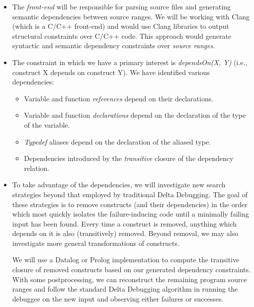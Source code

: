 \documentclass[11pt]{article}
\begin{document}
\begin{itemize}
\item The \emph{front-end} will be responsible for parsing source files and
  generating semantic dependencies between source ranges. We will be working
  with Clang (which is a C/C++ front-end) and would use Clang libraries to
  output structural constraints over C/C++ code.  This approach would generate
  syntactic and semantic dependency constraints over \emph{source ranges}.

\item The constraint in which we have a primary interest is \emph{dependsOn(X,
  Y)} (i.e., construct X depends on construct Y).  We have identified various
  dependencies:

\begin{itemize}
\item{Variable and function \emph{references} depend on their declarations.}
\item{Variable and function \emph{declarations} depend on the declaration of the
  type of the variable.}
\item{\emph{Typedef} aliases depend on the declaration of the aliased type.}
\item{Dependencies introduced by the \emph{transitive} closure of the dependency
  relation.
}
\end{itemize}

\item To take advantage of the dependencies, we will investigate new search
  strategies beyond that employed by traditional Delta Debugging.  The goal of
  these strategies is to remove constructs (and their dependencies) in the order
  which most quickly isolates the failure-inducing code until a minimally
  failing input has been found.  Every time a construct is removed, anything
  which depends on it is also (transitively) removed.  Beyond removal, we may
  also investigate more general transformations of constructs.

  We will use a Datalog or Prolog implementation to compute the transitive
  closure of removed constructs based on our generated dependency constraints.
  With some postprocessing, we can reconstruct the remaining program source
  ranges and follow the standard Delta Debugging algorithm in running the
  debuggee on the new input and observing either failures or successes.

\end{itemize}
\end{document}
